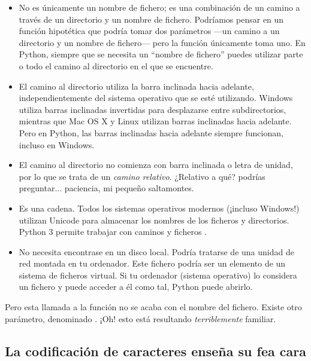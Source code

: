 \begin{itemize}

\item No es únicamente un nombre de fichero; es una combinación de un camino a través de un directorio y un nombre de fichero. Podríamos pensar en un función hipotética que podría tomar dos parámetros ---un camino a un directorio y un nombre de fichero--- pero la función  únicamente toma uno. En Python, siempre que se necesita un ``nombre de fichero'' puedes utilizar parte o todo el camino al directorio en el que se encuentre.

\item El camino al directorio utiliza la barra inclinada hacia adelante, independientemente del sistema operativo que se esté utilizando. Windows utiliza barras inclinadas invertidas para desplazarse entre subdirectorios, mientras que Mac OS X y Linux utilizan barras inclinadas hacia adelante. Pero en Python, las barras inclinadas hacia adelante siempre funcionan, incluso en Windows.

\item El camino al directorio no comienza con barra inclinada o letra de unidad, por lo que se trata de un \emph{camino relativo}. ¿Relativo a qué? podrías preguntar... paciencia, mi pequeño saltamontes.

\item Es una cadena. Todos los sistemas operativos modernos (¡incluso Windows!) utilizan Unicode para almacenar los nombres de los ficheros y directorios. Python 3 permite trabajar con caminos y ficheros .

\item No necesita encontrase en un disco local. Podría tratarse de una unidad de red montada en tu ordenador. Este fichero podría ser un elemento de un sistema de ficheros virtual. Si tu ordenador (sistema operativo) lo considera un fichero y puede acceder a él como tal, Python puede abrirlo.

\end{itemize}

Pero esta llamada a la función  no se acaba con el nombre del fichero. Existe otro parámetro, denominado . ¡Oh! esto está resultando \emph{terriblemente} familiar.

\subsection{La codificación de caracteres enseña su fea cara}


